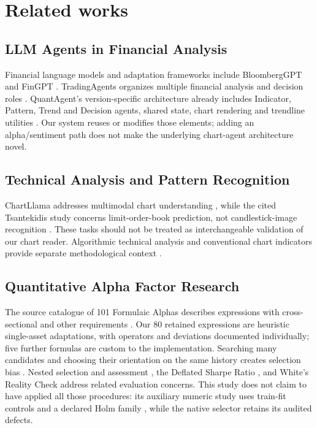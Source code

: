 \section{Related works}
\label{sec:relatedworks}

\subsection{LLM Agents in Financial Analysis}
Financial language models and adaptation frameworks include BloombergGPT and FinGPT \cite{wu2023bloomberggpt,yang2023fingpt}. TradingAgents organizes multiple financial analysis and decision roles \cite{tradingagents2024}. QuantAgent's version-specific architecture already includes Indicator, Pattern, Trend and Decision agents, shared state, chart rendering and trendline utilities \cite{xiong2025quantagent}. Our system reuses or modifies those elements; adding an alpha/sentiment path does not make the underlying chart-agent architecture novel. \subsection{Technical Analysis and Pattern Recognition}
ChartLlama addresses multimodal chart understanding \cite{han2023chartllama}, while the cited Tsantekidis study concerns limit-order-book prediction, not candlestick-image recognition \cite{tsantekidis2017lob}. These tasks should not be treated as interchangeable validation of our chart reader. Algorithmic technical analysis and conventional chart indicators provide separate methodological context \cite{lo2000technical,murphy1999technical}.

\subsection{Quantitative Alpha Factor Research}
The source catalogue of 101 Formulaic Alphas describes expressions with cross-sectional and other requirements \cite{kakushadze2016formulaic}. Our 80 retained expressions are heuristic single-asset adaptations, with operators and deviations documented individually; five further formulas are custom to the implementation. Searching many candidates and choosing their orientation on the same history creates selection bias \cite{harvey2016}. Nested selection and assessment \cite{varma2006bias}, the Deflated Sharpe Ratio \cite{bailey2014deflated}, and White's Reality Check \cite{white2000reality} address related evaluation concerns. This study does not claim to have applied all those procedures: its auxiliary numeric study uses train-fit controls and a declared Holm family \cite{holm1979multiple}, while the native selector retains its audited defects.

